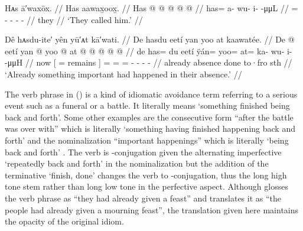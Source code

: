


\ex\label{ex:92-172-they-called-him}%
%
\begingl
	\glpreamble	Hᴀs ā′waxōx. //
	\glpreamble	Has aawax̱oox̱. //
	\gla	Has @  @ {} @ {} @ {} @ {} //
	\glb	has= a- wu- i-  -μμL //
	\glc	{}= - - -  - //
	\gld	they  {} {} {} {}  //
	\glft	‘They called him.’
		//
\endgl
\xe


\ex\label{ex:92-173-been-something-important}%
%
\begingl
	\glpreamble	Dê hᴀsdu-ite′ yên yū′ᴀt kā′wati. //
	\glpreamble	De hasdu eetí yan yoo at kaawatée. //
	\gla	De {}  @ {} eetí {}
		yan @ yoo @ at @  @ {} @ {} @ {} @ {} //
	\glb	de {} has= du eetí {}
		ÿán= yoo= at= ka- wu- i-  -μμH //
	\glc	now {}[ =  remains {}]
		= = = - - -
			 - //
	\gld	already {}  {} absence {}
		done\• to·fro\• sth\•  {} {} {} {} //
	\glft	‘Already something important had happened in their absence.’
		//
\endgl
\xe

The verb phrase  in (\lastx) is a kind of idiomatic avoidance term referring to a serious event such as a funeral or a battle.
It literally means ‘something finished being back and forth’.
Some other examples are the consecutive form  “after the battle was over with” which is literally ‘something having finished happening back and forth’ and the nominalization  “important happenings” which is literally ‘being back and forth’ \parencite[both][06/167]{leer:1973}.
The verb is -conjugation given the alternating imperfective  ‘repeatedly back and forth’ in the nominalization but the addition of the terminative  ‘finish, done’ changes the verb to -conjugation, thus the  long high tone stem rather than long low tone  in the perfective aspect.
Although \citeauthor{swanton:1909} glosses the verb phrase as “they had already given a feast” and translates it as “the people had already given a mourning feast”, the translation given here maintains the opacity of the original idiom.

